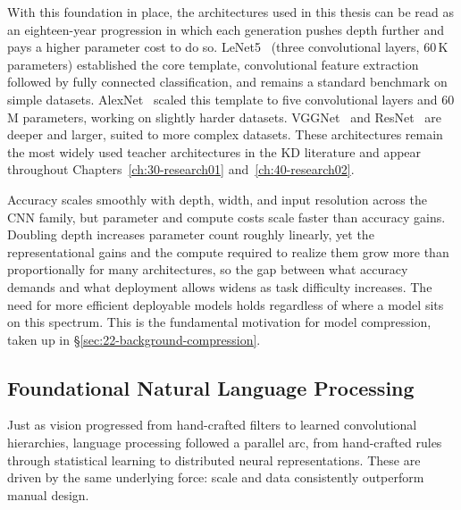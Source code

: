 \begin{foldable}
  With this foundation in place, the architectures used in this thesis can be read as an eighteen-year progression in which each generation pushes depth further and pays a higher parameter cost to do so.
  LeNet5~\cite{lecun1998gradient} (three convolutional layers, 60\,K parameters) established the core template, convolutional feature extraction followed by fully connected classification, and remains a standard benchmark on simple datasets.
  AlexNet~\cite{krizhevsky2012imagenet} scaled this template to five convolutional layers and 60\,M parameters, working on slightly harder datasets.
  VGGNet~\cite{simonyan2014very} and ResNet~\cite{he2016deep} are deeper and larger, suited to more complex datasets.
  These architectures remain the most widely used teacher architectures in the \ac{KD} literature and appear throughout Chapters~\ref{ch:30-research01} and~\ref{ch:40-research02}.
\end{foldable}

\begin{foldable}
  Accuracy scales smoothly with depth, width, and input resolution across the \ac{CNN} family, but parameter and compute costs scale faster than accuracy gains.
  Doubling depth increases parameter count roughly linearly, yet the representational gains and the compute required to realize them grow more than proportionally for many architectures, so the gap between what accuracy demands and what deployment allows widens as task difficulty increases.
  The need for more efficient deployable models holds regardless of where a model sits on this spectrum.
  This is the fundamental motivation for model compression, taken up in \S\ref{sec:22-background-compression}.
\end{foldable}

\subsection{Foundational Natural Language Processing} \label{sec:21-background-deeplearning-foundationalnlp}
\begin{foldable}
  Just as vision progressed from hand-crafted filters to learned convolutional hierarchies, language processing followed a parallel arc, from hand-crafted rules through statistical learning to distributed neural representations.
  These are driven by the same underlying force: scale and data consistently outperform manual design.
\end{foldable}

